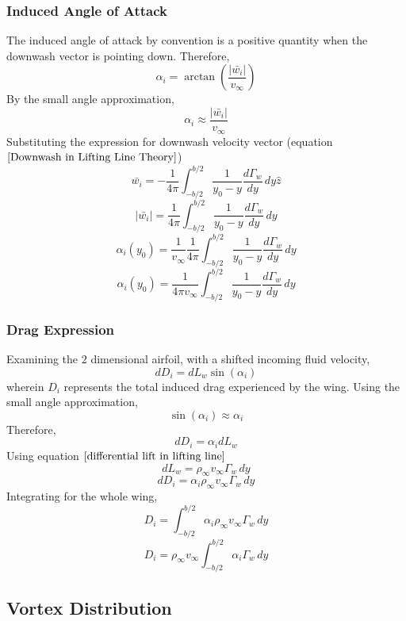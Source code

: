 \documentclass[a4paper, 12pt]{report}
\begin{document}
\begin{center}
\subsubsection{Induced Angle of Attack}
\begin{comment}
\end{comment}
The induced angle of attack by convention is a positive quantity when the downwash vector is pointing down. Therefore,
$$\alpha_{i} = \arctan\left(\frac{|\bar{w_{i}}|}{v_{\infty}}\right)$$
By the small angle approximation,
$$\alpha_{i} \approx \frac{|\bar{w_{i}}|}{v_{\infty}}$$
Substituting the expression for downwash velocity vector (equation $\ref{Downwash in Lifting Line Theory}$)
$$\bar{w_{i}} = -\frac{1}{4\pi} \int^{b/2}_{-b/2}\frac{1}{y_{0}-y}\frac{d\Gamma_{w}}{dy} \,dy\hat{z}$$
$$|\bar{w_{i}}| = \frac{1}{4\pi} \int^{b/2}_{-b/2}\frac{1}{y_{0}-y}\frac{d\Gamma_{w}}{dy} \,dy$$
$$\alpha_{i}(y_{0}) = \frac{1}{v_{\infty}}\frac{1}{4\pi} \int^{b/2}_{-b/2}\frac{1}{y_{0}-y}\frac{d\Gamma_{w}}{dy} \,dy$$
\begin{equation}
\alpha_{i}(y_{0}) = \frac{1}{4\pi v_{\infty}} \int^{b/2}_{-b/2}\frac{1}{y_{0}-y}\frac{d\Gamma_{w}}{dy} \,dy
\label{induced angle of attack Lifting Line Theory}
\end{equation}

\subsubsection{Drag Expression}
\begin{comment}
\end{comment}
Examining the $2$ dimensional airfoil, with a shifted incoming fluid velocity,
$$dD_{i} = dL_{w}\sin(\alpha_{i})$$
wherein $D_{i}$ represents the total induced drag experienced by the wing. Using the small angle approximation,
$$\sin(\alpha_{i}) \approx \alpha_{i}$$
Therefore,
$$dD_{i} = \alpha_{i}dL_{w}$$
Using equation $\ref{differential lift in lifting line}$
$$dL_{w} = \rho_{\infty}v_{\infty}\Gamma_{w}\,dy$$
$$dD_{i} = \alpha_{i}\rho_{\infty}v_{\infty}\Gamma_{w}\,dy$$
Integrating for the whole wing,
$$D_{i} = \int^{b/2}_{-b/2}\alpha_{i}\rho_{\infty}v_{\infty}\Gamma_{w}\,dy$$
\begin{equation}
D_{i} = \rho_{\infty}v_{\infty}\int^{b/2}_{-b/2}\alpha_{i}\Gamma_{w}\,dy
\label{Induced Drag Lifting Line Theory}
\end{equation}


\subsection{Vortex Distribution}
\begin{comment}
\end{comment}


\end{center}
\end{document}
